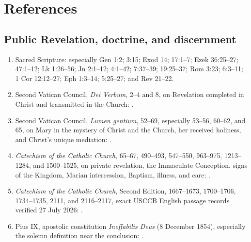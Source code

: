 \section{References}

\begingroup
\footnotesize
\linespread{0.98}\selectfont
\setlength{\parskip}{0pt}

\subsection{Public Revelation, doctrine, and discernment}

\begin{enumerate}
  \item Sacred Scripture: especially Gen 1:2; 3:15; Exod 14; 17:1--7; Ezek 36:25--27; 47:1--12; Lk 1:26--56; Jn 2:1--12; 4:1--42; 7:37--39; 19:25--37; Rom 3:23; 6:3--11; 1 Cor 12:12--27; Eph 1:3--14; 5:25--27; and Rev 21--22.
  \item Second Vatican Council, \emph{Dei Verbum}, 2--4 and 8, on Revelation completed in Christ and transmitted in the Church: .
  \item Second Vatican Council, \emph{Lumen gentium}, 52--69, especially 53--56, 60--62, and 65, on Mary in the mystery of Christ and the Church, her received holiness, and Christ's unique mediation: .
  \item \emph{Catechism of the Catholic Church}, 65--67, 490--493, 547--550, 963--975, 1213--1284, and 1500--1525, on private revelation, the Immaculate Conception, signs of the Kingdom, Marian intercession, Baptism, illness, and care: .
  \item \emph{Catechism of the Catholic Church}, Second Edition, 1667--1673, 1700--1706, 1734--1735, 2111, and 2116--2117, exact USCCB English passage records verified 27 July 2026: .
  \item Pius IX, apostolic constitution \emph{Ineffabilis Deus} (8 December 1854), especially the solemn definition near the conclusion: .

\end{enumerate}
